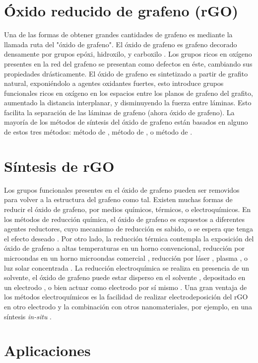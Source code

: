 \section{Óxido reducido de grafeno (rGO)}
Una de las formas de obtener grandes cantidades de grafeno es mediante la llamada ruta del "óxido de grafeno". El óxido de grafeno es grafeno decorado densamente por grupos epóxi, hidroxilo, y carboxilo \citep{Dreyer2010}. Los grupos ricos en oxígeno presentes en la red del grafeno se presentan como defectos en éste, cambiando sus propiedades drásticamente.
El óxido de grafeno es sintetizado a partir de grafito natural, exponiéndolo a agentes oxidantes fuertes, esto introduce grupos funcionales ricos en oxígeno en los espacios entre los planos de grafeno del grafito, aumentado la distancia interplanar, y disminuyendo la fuerza entre láminas. Esto facilita la separación de las láminas de grafeno (ahora óxido de grafeno). La mayoría de los métodos de síntesis del óxido de grafeno están basados en alguno de estos tres métodos: método de \citet{Brodie1859}, método de \citep{Staudenmaier1898}, o método de \citet{Hummers1958}.



\section{Síntesis de rGO}
Los grupos funcionales presentes en el óxido de grafeno pueden ser removidos para volver a la estructura del grafeno como tal. Existen muchas formas de reducir el óxido de grafeno, por medios químicos, térmicos, o electroquímicos. En los métodos de reducción química, el óxido de grafeno es expuestos a diferentes agentes reductores, cuyo mecanismo de reducción es sabido, o se espera que tenga el efecto deseado \citep{Chua2015}. Por otro lado, la reducción térmica contempla la exposición del óxido de grafeno a altas temperaturas en un horno convencional, reducción por microondas en un horno microondas comercial \citep{Zhu2010a}, reducción por láser \citep{El-Kady2013}, plasma \citep{Lee2012}, o luz solar concentrada \citep{Mohandoss2017}. La reducción electroquímica se realiza en presencia de un solvente, el óxido de grafeno puede estar disperso en el solvente \citep{Liu2011}, depositado en un electrodo \citep{Harima2011, Toh2014}, o bien actuar como electrodo por sí mismo \citep{Feng2016}. Una gran ventaja de los métodos electroquímicos es la facilidad de realizar electrodeposición del rGO en otro electrodo y la combinación con otros nanomateriales, por ejemplo, en una síntesis \emph{in-situ} \citep{Liu2011, Xie2014}.

\section{Aplicaciones}